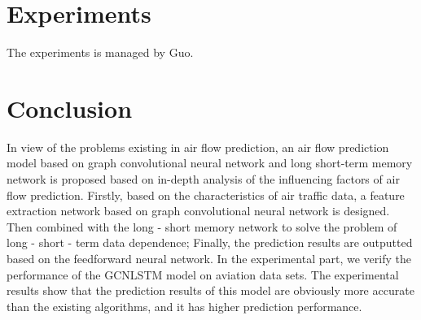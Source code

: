 \documentclass[journal,article,submit,moreauthors,pdftex]{Definitions/mdpi}
\begin{document}
\section{Experiments}\label{sec:3}
The experiments is managed by Guo.


\section{Conclusion}\label{sec:4}
In view of the problems existing in air flow prediction, an air flow prediction model based on graph convolutional neural network and long short-term memory network is proposed based on in-depth analysis of the influencing factors of air flow prediction. Firstly, based on the characteristics of air traffic data, a feature extraction network based on graph convolutional neural network is designed. Then combined with the long - short memory network to solve the problem of long - short - term data dependence; Finally, the prediction results are outputted based on the feedforward neural network. In the experimental part, we verify the performance of the GCNLSTM model on aviation data sets. The experimental results show that the prediction results of this model are obviously more accurate than the existing algorithms, and it has higher prediction performance.
\vspace{6pt} 



\end{document}
